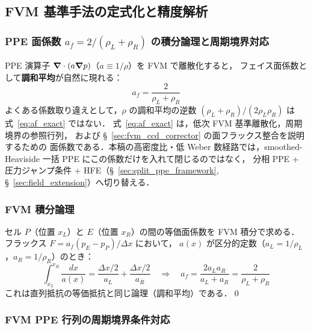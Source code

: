 \subsection{FVM 基準手法の定式化と精度解析}
\label{app:fvm_reference_methods}

\subsubsection{\texorpdfstring{PPE 面係数 $a_f = 2/(\rho_L+\rho_R)$ の積分論理と周期境界対応}{PPE 面係数 a\_f = 2/(ρ\_L+ρ\_R) の積分論理と周期境界対応}}
\label{app:fvm_face_coeff}
\label{sec:fvm_face_coeff}

PPE 演算子 $\bm{\nabla}\cdot(a\bm{\nabla} p)$（$a \equiv 1/\rho$）を FVM で離散化すると，
フェイス面係数として\textbf{調和平均}が自然に現れる：
\begin{equation}
  a_f = \frac{2}{\rho_L + \rho_R}
  \label{eq:af_exact}
\end{equation}
よくある係数取り違えとして，$\rho$ の調和平均の逆数
$(\rho_L+\rho_R)/(2\rho_L\rho_R)$ は式~\eqref{eq:af_exact} ではない．
式~\eqref{eq:af_exact} は，低次 FVM 基準離散化，周期境界の参照行列，
および §~\ref{sec:fvm_ccd_corrector} の面フラックス整合を説明するための
面係数である．本稿の高密度比・低 Weber 数経路では，smoothed-Heaviside
一括 PPE にこの係数だけを入れて閉じるのではなく，
分相 PPE + 圧力ジャンプ条件 + HFE（§~\ref{sec:split_ppe_framework},
§~\ref{sec:field_extension}）へ切り替える．

\subsubsection{FVM 積分論理}

セル $P$（位置 $x_L$）と $E$（位置 $x_R$）の間の等価面係数を FVM 積分で求める．
フラックス $F = a_f(p_E - p_P)/\Delta x$ において，
$a(x)$ が区分的定数（$a_L = 1/\rho_L$，$a_R = 1/\rho_R$）のとき：
\[
  \int_{x_L}^{x_R} \frac{dx}{a(x)}
  = \frac{\Delta x/2}{a_L} + \frac{\Delta x/2}{a_R}
  \quad\Rightarrow\quad
  a_f = \frac{2a_L a_R}{a_L+a_R}
  = \frac{2}{\rho_L+\rho_R}
\]
これは直列抵抗の等価抵抗と同じ論理（調和平均）である．\qed

\subsubsection{FVM PPE 行列の周期境界条件対応}
\label{sec:fvm_periodic}

